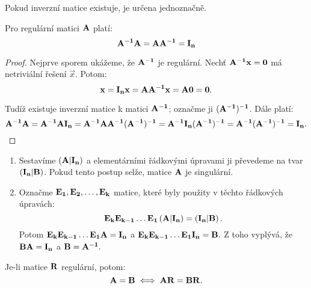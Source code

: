 \begin{corollary}
    Pokud inverzní matice existuje, je určena jednoznačně.
\end{corollary}

\begin{proposition}
    Pro regulární matici $\mathbf{A}$ platí:
    $$\mathbf{A^{-1}}\mathbf{A} = \mathbf{A}\mathbf{A^{-1}} = \mathbf{I_n}$$
\end{proposition}

\begin{proof}
    Nejprve sporem ukážeme, že $\mathbf{A^{-1}}$ je regulární. Nechť
    $\mathbf{A^{-1}}\mathbf{x} = \mathbf{0}$ má netriviální řešení $\vec{x}$. Potom:
    $$\mathbf{x} = \mathbf{I_{n}}\mathbf{x} = \mathbf{A}\mathbf{A^{-1}}\mathbf{x} =
    \mathbf{A}\mathbf{0} = \mathbf{0}.$$

    Tudíž existuje inverzní matice k matici $\mathbf{A^{-1}}$; označme ji
    $\mathbf{(\mathbf{A^{-1}})^{-1}}$. Dále platí: $$\mathbf{A^{-1}}\mathbf{A} =
    \mathbf{A^{-1}}\mathbf{A}\mathbf{I_{n}} =
    \mathbf{A^{-1}}\mathbf{A}\mathbf{A^{-1}}\mathbf{(\mathbf{A^{-1}})^{-1}} =
    \mathbf{A^{-1}}\mathbf{I_{n}}\mathbf{(\mathbf{A^{-1}})^{-1}} =
    \mathbf{A^{-1}}\mathbf{(\mathbf{A^{-1}})^{-1}} = \mathbf{I_{n}}.$$
\end{proof}

\begin{remark}
    \leavevmode
    \begin{enumerate}
        \item Sestavíme $\left(\mathbf{A}|\mathbf{I_{n}}\right)$ a elementárními
            řádkovými úpravami ji převedeme na tvar
            $\left(\mathbf{I_{n}}|\mathbf{B}\right)$. Pokud tento postup selže,
            matice $\mathbf{A}$ je singulární.
        \item Označme $\mathbf{E_1}, \mathbf{E_2}, \dots, \mathbf{E_k}$ matice, které
            byly použity v těchto řádkových úpravách:
            $$\mathbf{E_k}\mathbf{E_{k-1}}\dots\mathbf{E_1} 
            \left(\mathbf{A}|\mathbf{I_{n}}\right) =
            \left(\mathbf{I_{n}}|\mathbf{B}\right).$$ 
            Potom $\mathbf{E_k}\mathbf{E_{k-1}}\dots\mathbf{E_1}\mathbf{A} =
            \mathbf{I_{n}}$ a
            $\mathbf{E_k}\mathbf{E_{k-1}}\dots\mathbf{E_1}\mathbf{I_{n}} = \mathbf{B}.$ Z
            toho vyplývá, že $\mathbf{B}\mathbf{A} = \mathbf{I_{n}}$ a $\mathbf{B} =
            \mathbf{A^{-1}}.$
    \end{enumerate}
\end{remark}

\begin{observation}
    Je-li matice $\mathbf{R}$ regulární, potom: $$ \mathbf{A} = \mathbf{B} \iff
    \mathbf{A}\mathbf{R} = \mathbf{B}\mathbf{R}.$$
\end{observation}

